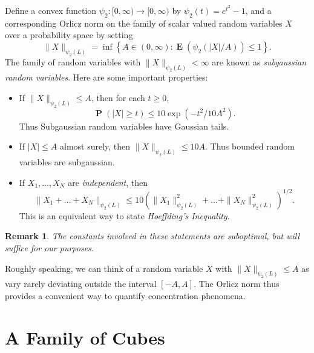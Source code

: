 \documentclass[12pt,reqno]{article}
\numberwithin{equation}{section}
\newtheorem{remark}[theorem]{Remark}
\DeclareMathOperator{\EE}{\mathbf{E}}
\DeclareMathOperator{\PP}{\mathbf{P}}
\newcommand{\psitwo}[1]{\| {#1} \|_{\psi_2(L)}}
\begin{document}
Define a convex function $\psi_2: [0,\infty) \to [0,\infty)$ by $\psi_2(t) = e^{t^2} - 1$, and a corresponding Orlicz norm on the family of scalar valued random variables $X$ over a probability space by setting
%
\[ \psitwo{X} = \inf \left\{ A \in (0,\infty) : \EE(\psi_2(|X|/A)) \leq 1 \right\}. \]
%
The family of random variables with $\psitwo{X} < \infty$ are known as \emph{subgaussian random variables}. Here are some important properties:
%
\begin{itemize}
	\item If $\psitwo{X} \leq A$, then for each $t \geq 0$,
	\[ \PP \left( |X| \geq t \right) \leq 10 \exp \left( -t^2/10A^2 \right). \]
    Thus Subgaussian random variables have Gaussian tails.

	\item If $|X| \leq A$ almost surely, then $\psitwo{X} \leq 10 A$. Thus bounded random variables are subgaussian.

	
	
	\item If $X_1, \dots, X_N$ are \emph{independent}, then
	\[ \psitwo{X_1 + \dots + X_N} \leq 10 \left( \psitwo{X_1}^2 + \dots + \psitwo{X_N}^2 \right)^{1/2}. \]
    This is an equivalent way to state \emph{Hoeffding's Inequality}.
\end{itemize}

\begin{remark}
    The constants involved in these statements are suboptimal, but will suffice for our purposes.
\end{remark}

Roughly speaking, we can think of a random variable $X$ with $\psitwo{X} \leq A$ as vary rarely deviating outside the interval $[-A,A]$. The Orlicz norm thus provides a convenient way to quantify concentration phenomena.

\section{A Family of Cubes}
\end{document}
